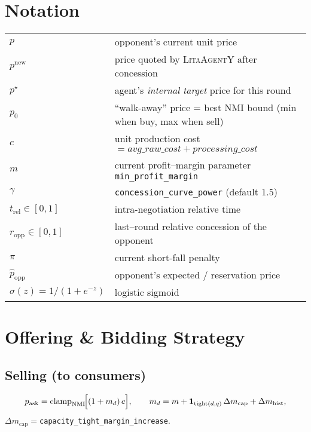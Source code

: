 \section*{Notation}
\begin{tabular}{@{}ll@{}}
\(p\)                       & opponent’s current unit price            \\
\(p^{\text{new}}\)          & price quoted by \textsc{LitaAgentY} after concession \\
\(p^{\star}\)               & agent’s \emph{internal target} price for this round \\
\(p_{0}\)                   & “walk-away” price = best NMI bound (min when buy, max when sell) \\
\(c\)                       & unit production cost \(= \textit{avg\_raw\_cost} + \textit{processing\_cost}\) \\
\(m\)                       & current profit–margin parameter \texttt{min\_profit\_margin}        \\
\(\gamma\)                  & \texttt{concession\_curve\_power} (default \(1.5\))                 \\
\(t_{\mathrm{rel}}\in[0,1]\)& intra-negotiation relative time                                         \\
\(r_{\mathrm{opp}}\in[0,1]\)& last–round relative concession of the opponent                         \\
\(\pi\)                     & current short-fall penalty                                             \\
\(\hat p_{\mathrm{opp}}\)   & opponent’s expected / reservation price                                \\
\(\sigma(z)=1/(1+e^{-z})\)  & logistic sigmoid
\end{tabular}

\section{Offering \& Bidding Strategy}
\subsection*{Selling (to consumers)}
\[
p_{\text{ask}}
  = \operatorname{clamp}_{\text{NMI}}
    \!\Bigl[(1+m_{d})\,c\Bigr], \qquad
m_{d} = m
        + \mathbf 1_{\text{tight}(d,q)}\,\Delta m_{\text{cap}}
        + \Delta m_{\text{hist}} ,
\]
\(\Delta m_{\text{cap}}=\)\texttt{capacity\_tight\_margin\_increase}.
\medskip

